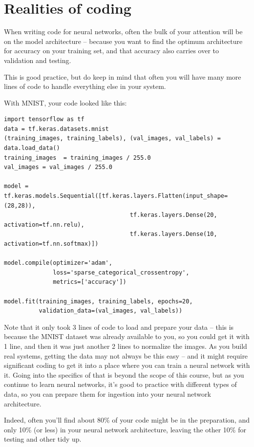 \section{Realities of coding}

When writing code for neural networks, often the bulk of your attention will be on the model architecture -- because you want to find the optimum architecture for accuracy on your training set, and that accuracy also carries over to validation and testing.

This is good practice, but do keep in mind that often you will have many more lines of code to handle everything else in your system.

With MNIST, your code looked like this:

\begin{lstlisting}
import tensorflow as tf
data = tf.keras.datasets.mnist
(training_images, training_labels), (val_images, val_labels) = data.load_data()
training_images  = training_images / 255.0
val_images = val_images / 255.0

model = tf.keras.models.Sequential([tf.keras.layers.Flatten(input_shape=(28,28)),
                                    tf.keras.layers.Dense(20, activation=tf.nn.relu),
                                    tf.keras.layers.Dense(10, activation=tf.nn.softmax)])

model.compile(optimizer='adam',
              loss='sparse_categorical_crossentropy',
              metrics=['accuracy'])

model.fit(training_images, training_labels, epochs=20, 
          validation_data=(val_images, val_labels))
\end{lstlisting}


Note that it only took 3 lines of code to load and prepare your data -- this is because the MNIST dataset was already available to you, so you could get it with 1 line, and then it was just another 2 lines to normalize the images. As you build real systems, getting the data may not always be this easy -- and it might require significant coding to get it into a place where you can train a neural network with it. Going into the specifics of that is beyond the scope of this course, but as you continue to learn neural networks, it’s good to practice with different types of data, so you can prepare them for ingestion into your neural network architecture.

Indeed, often you'll find about 80\% of your code might be in the preparation, and only 10\% (or less) in your neural network architecture, leaving the other 10\% for testing and other tidy up.

